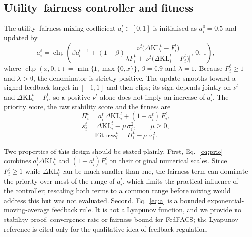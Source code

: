 \documentclass[pdflatex,sn-basic]{sn-jnl}
\newcommand{\KL}{\Delta\mathrm{KL}}
\newcommand{\Fit}{\mathrm{Fitness}}
\begin{document}
\subsection{Utility--fairness controller and fitness}\label{sec4.4}
The utility--fairness mixing coefficient $a_i^t\in[0,1]$ is initialised as $a_i^0=0.5$ and updated by
\begin{equation}\label{eq:a}
a_i^t=\operatorname{clip}\!\left(\beta a_i^{t-1}+(1-\beta)\frac{\nu^t\bigl(\KL_i^t-F_i^t\bigr)}{\lambda F_i^t+\bigl|\nu^t\bigl(\KL_i^t-F_i^t\bigr)\bigr|},\,0,\,1\right),
\end{equation}
where $\operatorname{clip}(x,0,1)=\min\{1,\max\{0,x\}\}$, $\beta=0.9$ and $\lambda=1$. Because $F_i^t\ge 1$ and $\lambda>0$, the denominator is strictly positive. The update smooths toward a signed feedback target in $[-1,1]$ and then clips; its sign depends jointly on $\nu^t$ and $\KL_i^t-F_i^t$, so a positive $\nu^t$ alone does not imply an increase of $a_i^t$. The priority score, the raw stability score and the fitness are
\begin{equation}\label{eq:prio}
\Pi_i^t=a_i^t\,\KL_i^t+(1-a_i^t)\,F_i^t,
\end{equation}
\begin{equation}\label{eq:s}
s_i^t=\KL_i^t-\mu\,\sigma_i^2,\qquad \mu\ge 0,
\end{equation}
\begin{equation}\label{eq:fit}
\Fit_i^t=\Pi_i^t-\mu\,\sigma_i^2 .
\end{equation}

Two properties of this design should be stated plainly. First, Eq.~\eqref{eq:prio} combines $a_i^t\KL_i^t$ and $(1-a_i^t)F_i^t$ on their original numerical scales. Since $F_i^t\ge 1$ while $\KL_i^t$ can be much smaller than one, the fairness term can dominate the priority over most of the range of $a_i^t$, which limits the practical influence of the controller; rescaling both terms to a common range before mixing would address this but was not evaluated. Second, Eq.~\eqref{eq:a} is a bounded exponential-moving-average feedback rule. It is not a Lyapunov function, and we provide no stability proof, convergence rate or fairness bound for FedFACS; the Lyapunov reference \citep{chaudhari2002} is cited only for the qualitative idea of feedback regulation.
\end{document}
